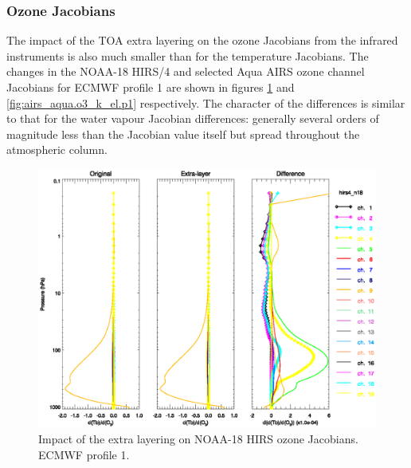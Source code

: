 \subsubsection{Ozone Jacobians}
The impact of the TOA extra layering on the ozone Jacobians from the infrared instruments is also much smaller than for the temperature Jacobians. The changes in the NOAA-18 HIRS/4 and selected Aqua AIRS ozone channel Jacobians for ECMWF profile 1 are shown in figures \ref{fig:hirs4_n18.o3_k_el.p1} and \ref{fig:airs_aqua.o3_k_el.p1} respectively. The character of the differences is similar to that for the water vapour Jacobian differences: generally several orders of magnitude less than the Jacobian value itself but spread throughout the atmospheric column.
\begin{figure}[htp]
  \centering
  \includegraphics[scale=0.8]{graphics/hirs4_n18.o3_k_el.p1.eps}
  \caption{Impact of the extra layering on NOAA-18 HIRS ozone Jacobians. ECMWF profile 1.}
  \label{fig:hirs4_n18.o3_k_el.p1}
\end{figure}
